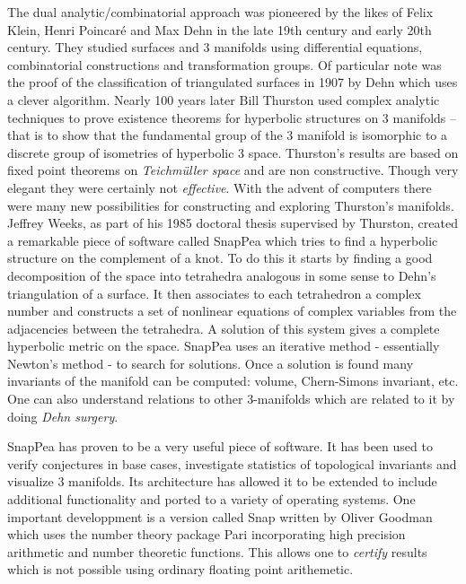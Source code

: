 \documentclass[14pt,fleqn]{article}
\begin{document}
The dual analytic/combinatorial approach was pioneered by the likes of Felix Klein, Henri Poincaré and Max Dehn in the late 19th century and early 20th century.
They studied surfaces
 and 3  manifolds using  
differential equations,
combinatorial constructions
and transformation groups.
Of particular note was the proof of  the classification of triangulated surfaces in 1907 by Dehn which uses a clever algorithm. 
Nearly 100 years later Bill Thurston
used complex analytic techniques to prove
existence theorems 
for hyperbolic structures on 3 manifolds
\cite{Thu1}
-- that is to show that the fundamental group of the 3 manifold is isomorphic
to a discrete group of isometries of 
hyperbolic 3 space.
Thurston's results are  based on fixed point 
theorems on \textit{Teichm\"{u}ller space}
and are non constructive.
Though very elegant 
they were certainly not \textit{effective}.
With the advent of computers 
there were many new possibilities
for constructing and exploring Thurston's manifolds.
Jeffrey Weeks,  as part of his 1985 doctoral thesis
supervised by Thurston,
created a remarkable piece of software called SnapPea which tries to find a
hyperbolic structure on the complement of a knot.
To do this it starts  by finding a good  decomposition of the  space into tetrahedra analogous in some sense 
to Dehn's triangulation of a surface.
It then associates to each tetrahedron a complex number 
and constructs a
set of nonlinear equations of complex variables from the adjacencies between the tetrahedra.
A solution of this system  gives a complete hyperbolic metric on the space.
SnapPea  uses an iterative method -  essentially Newton's method - to search for solutions. 
Once a solution is found many 
invariants of the manifold can be computed: volume, Chern-Simons invariant, etc.
One can also understand relations to other 3-manifolds which are related to it 
 by doing \textit{Dehn surgery}.
 
SnapPea has proven to be a very useful piece of software. It has been used to verify conjectures in base cases, 
investigate statistics of topological invariants and visualize 3 manifolds.
Its architecture has allowed it to be extended to include additional functionality
\cite{snappy} and ported to a variety of operating systems.
One important developpment is a version
called Snap written by Oliver Goodman \cite{snap}
which uses  the number theory package Pari incorporating  high precision arithmetic and number theoretic functions. 
This allows one to \textit{certify}
results 
which is not possible using
ordinary floating point arithemetic.
\end{document}
